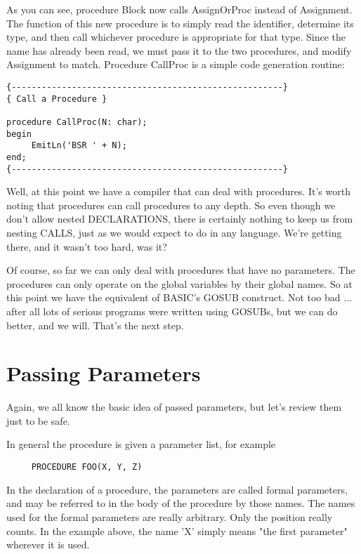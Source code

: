 As you can see, procedure Block now calls AssignOrProc instead of Assignment. The function of this new procedure is to simply read the identifier, determine  its  type, and  then  call whichever procedure  is  appropriate  for  that  type. Since the name  has already been read, we  must  pass  it to the two procedures, and modify Assignment to match. Procedure CallProc is a simple code generation routine:

\begin{verbatim}
{------------------------------------------------------}
{ Call a Procedure }

procedure CallProc(N: char);
begin
     EmitLn('BSR ' + N);
end;
{------------------------------------------------------}
\end{verbatim}

Well, at  this  point  we  have  a  compiler  that can deal with procedures. It's  worth  noting  that   procedures   can  call procedures to any depth. So even though we  don't  allow  nested DECLARATIONS, there  is certainly nothing to keep us from nesting CALLS, just as  we  would  expect  to  do in any language. We're getting there, and it wasn't too hard, was it?

Of course, so far we can  only  deal with procedures that have no parameters. The  procedures  can  only operate on  the  global variables  by  their  global names. So at this point we have the equivalent of BASIC's GOSUB construct. Not too bad ... after all lots of serious programs were written using GOSUBs, but we can do better, and we will. That's the next step.

\section{Passing Parameters}

Again, we all know the basic idea of passed parameters, but let's review them just to be safe.

In general the procedure is given a parameter list, for example

\begin{verbatim}
     PROCEDURE FOO(X, Y, Z)
\end{verbatim}

In  the declaration of a procedure, the  parameters  are  called formal  parameters, and may be referred to in  the  body  of  the procedure  by  those  names. The  names  used for  the  formal parameters  are  really  arbitrary. Only  the  position really counts. In  the  example  above, the name 'X' simply means "the first parameter" wherever it is used.

